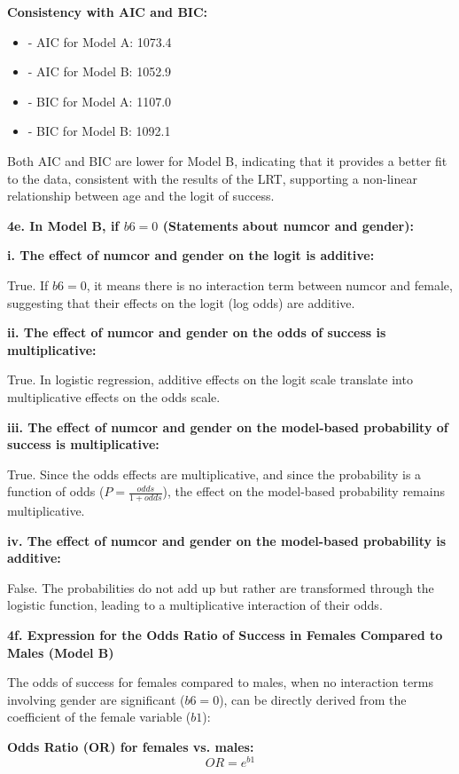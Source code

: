 \documentclass{article}
\begin{document}
\textbf{Consistency with AIC and BIC:}
\begin{itemize}
    \item - AIC for Model A: 1073.4
    \item - AIC for Model B: 1052.9
    \item - BIC for Model A: 1107.0
    \item - BIC for Model B: 1092.1
\end{itemize}

Both AIC and BIC are lower for Model B, indicating that it provides a better fit to the data, consistent with the results of the LRT, supporting a non-linear relationship between age and the logit of success.

\textbf{4e. In Model B, if \(b6=0\) (Statements about numcor and gender):}

\textbf{i. The effect of numcor and gender on the logit is additive:  }

True. If \(b6=0\), it means there is no interaction term between numcor and female, suggesting that their effects on the logit (log odds) are additive.

\textbf{ii. The effect of numcor and gender on the odds of success is multiplicative:  }

True. In logistic regression, additive effects on the logit scale translate into multiplicative effects on the odds scale.

\textbf{iii. The effect of numcor and gender on the model-based probability of success is multiplicative:  }

True. Since the odds effects are multiplicative, and since the probability is a function of odds (\(P = \frac{odds}{1 + odds}\)), the effect on the model-based probability remains multiplicative.

\textbf{iv. The effect of numcor and gender on the model-based probability is additive: } 

False. The probabilities do not add up but rather are transformed through the logistic function, leading to a multiplicative interaction of their odds.

\textbf{4f. Expression for the Odds Ratio of Success in Females Compared to Males (Model B)}

The odds of success for females compared to males, when no interaction terms involving gender are significant (\(b6 = 0\)), can be directly derived from the coefficient of the female variable (\(b1\)):

\textbf{Odds Ratio (OR) for females vs. males:}
\[ OR = e^{b1} \]
\end{document}
